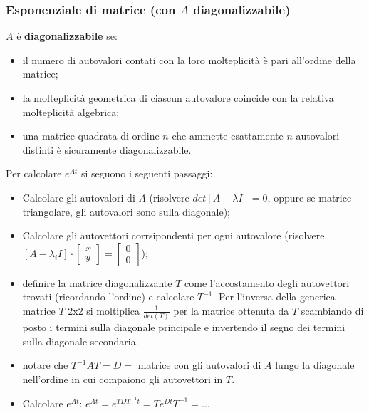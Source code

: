 \begin{landscape}
    \subsubsection*{Esponenziale di matrice (con $A$ diagonalizzabile)}
    $A$ è \textbf{diagonalizzabile} se:
    \begin{itemize}
        \item il numero di autovalori contati con la loro molteplicità è pari all’ordine della matrice;
        \item la molteplicità geometrica di ciascun autovalore coincide con la relativa molteplicità algebrica;
        \item una matrice quadrata di ordine $n$ che ammette esattamente $n$ autovalori distinti è sicuramente diagonalizzabile.
    \end{itemize}
    Per calcolare $e^{At}$ si seguono i seguenti passaggi:
    \begin{itemize}
        \item Calcolare gli autovalori di $A$ (risolvere $det[A-\lambda I] = 0$, oppure se matrice triangolare, gli autovalori sono sulla diagonale);
        \item Calcolare gli autovettori corrsipondenti per ogni autovalore \newline (risolvere $[A-\lambda_i I] \cdot \left[\begin{matrix}
            x\\y
        \end{matrix}\right] = \left[\begin{matrix}
            0\\0
        \end{matrix}\right]$);
        \item definire la matrice diagonalizzante $T$ come l'accostamento degli autovettori trovati (ricordando l'ordine) e calcolare $T^{-1}$. Per l’inversa della generica matrice $T$ 2x2 si moltiplica $\frac{1}{det(T)}$ per la matrice ottenuta da $T$ scambiando di posto i termini sulla diagonale principale e invertendo
        il segno dei termini sulla diagonale secondaria.
        \item notare che $T^{-1} A T = D = $ matrice con gli autovalori di $A$ lungo la diagonale nell'ordine in cui compaiono gli autovettori in $T$.
        \item Calcolare $e^{At}$:\newline
        $e^{At} = e^{TDT^{-1} t} = T e^{Dt} T^{-1} = \dots$
    \end{itemize}

\end{landscape}
